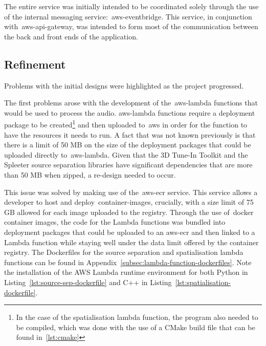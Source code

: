 The entire service was initially intended
to be coordinated solely through the use of the internal messaging service:~\gls{aws-eventbridge}.
This service, in conjunction with~\gls{aws-api-gateway},
was intended to form most of the communication between the back and front ends of the application.

\subsection{Refinement}\label{subsec:refinement}

Problems with the initial designs were highlighted as the project progressed.

The first problems arose with the development of the~\gls{aws-lambda} functions that would be used to process the audio.
\gls{aws-lambda} functions
require a deployment package
to be created\footnote{In the case of the spatialisation lambda function, the program also needed to be compiled, which was done with the use of a CMake build file that can be found in~\ref{lst:cmake}}
and then uploaded to~\gls{aws} in order for the function to have the resources it needs to run.
A fact that was not known previously is that
there is a limit of 50 MB on the size of the deployment packages that could be uploaded directly to~\gls{aws-lambda}.
Given that the 3D Tune-In Toolkit and the Spleeter source separation libraries have significant dependencies
that are more than 50 MB when zipped, a re-design needed to occur.

This issue was solved by making use of the~\gls{aws-ecr} service.
This service allows a developer to host and deploy~\glspl{container-image},
crucially, with a size limit of 75 GB allowed for each image uploaded to the registry.
Through the use of~\gls{docker} container images,
the code for the Lambda functions was bundled into deployment packages
that could be uploaded to an
\gls{aws-ecr} and then linked to a Lambda function
while staying well under the data limit offered by the container registry.
The Dockerfiles for the source separation and spatialisation lambda functions can be found in Appendix~\ref{subsec:lambda-function-dockerfiles}.
Note the installation of the AWS Lambda runtime environment for both Python in Listing~\ref{lst:source-sep-dockerfile} and C++ in Listing~\ref{lst:spatialisation-dockerfile}.

